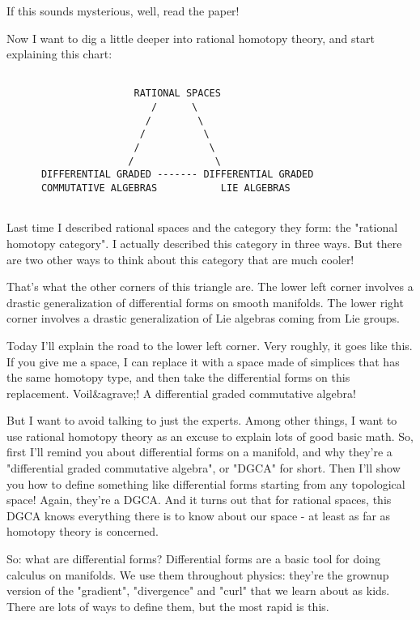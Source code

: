 If this sounds mysterious, well, read the paper!

Now I want to dig a little deeper into rational homotopy theory,
and start explaining this chart:


\begin{verbatim}

                      RATIONAL SPACES
                         /      \  
                        /        \  
                       /          \  
                      /            \
                     /              \
      DIFFERENTIAL GRADED ------- DIFFERENTIAL GRADED
      COMMUTATIVE ALGEBRAS           LIE ALGEBRAS
      
\end{verbatim}
    
Last time I described rational spaces and the category they form: the
"rational homotopy category".  I actually described this category in
three ways.  But there are two other ways to think about this category
that are much cooler!

That's what the other corners of this triangle are.  The lower left
corner involves a drastic generalization of differential forms on
smooth manifolds.  The lower right corner involves a drastic
generalization of Lie algebras coming from Lie groups.

Today I'll explain the road to the lower left corner.  Very roughly,
it goes like this.  If you give me a space, I can replace it with a
space made of simplices that has the same homotopy type, and then take
the differential forms on this replacement.  Voil&agrave;!  A
differential graded commutative algebra!

But I want to avoid talking to just the experts.  Among other things,
I want to use rational homotopy theory as an excuse to explain lots of
good basic math.  So, first I'll remind you about differential forms
on a manifold, and why they're a "differential graded commutative
algebra", or "DGCA" for short.  Then I'll show you how
to define something like differential forms starting from any
topological space!  Again, they're a DGCA.  And it turns out that for
rational spaces, this DGCA knows everything there is to know about our
space - at least as far as homotopy theory is concerned.

So: what are differential forms?  Differential forms are a basic
tool for doing calculus on manifolds.  We use them throughout physics:
they're the grownup version of the "gradient",
"divergence" and "curl" that we learn about as
kids.  There are lots of ways to define them, but the most rapid is
this.

